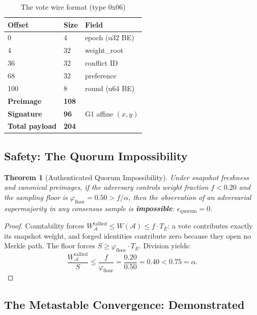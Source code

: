 \documentclass[11pt, a4paper]{article}
\theoremstyle{plain}
\newtheorem{theorem}{Theorem}
\theoremstyle{definition}
\theoremstyle{remark}
\begin{document}
\begin{table}[h]
\centering
{}
\begin{tabular}{lll}
\rowcolor{hsmaTeal!20} \textbf{Offset} & \textbf{Size} & \textbf{Field} \\
\midrule
0 & 4 & epoch (u32 BE) \\
4 & 32 & weight\_root \\
36 & 32 & conflict ID \\
68 & 32 & preference \\
100 & 8 & round (u64 BE) \\
\midrule
\textbf{Preimage} & \textbf{108} & \\
\textbf{Signature} & \textbf{96} & G1 affine $(x, y)$ \\
\textbf{Total payload} & \textbf{204} & \\
\bottomrule
\end{tabular}
\caption{The vote wire format (type 0x06)}
\end{table}

\subsection{Safety: The Quorum Impossibility}

\begin{theorem}[Authenticated Quorum Impossibility]
\label{thm:quorum}
Under snapshot freshness and canonical preimages, if the adversary
controls weight fraction $f < 0.20$ and the sampling floor is
 $\varphi_{\text{floor}} = 0.50 > f/\alpha$, then the observation of
an adversarial supermajority in any consensus sample is
\textbf{impossible}: $\epsilon_{\text{quorum}} = 0$.
\end{theorem}
\begin{proof}
Countability forces $W_{\mathcal{A}}^{\text{tallied}} \le W(\mathcal{A})
\le f \cdot T_E$: a vote contributes exactly its snapshot weight, and
forged identities contribute zero because they open no Merkle path.
The floor forces $S \ge \varphi_{\text{floor}} \cdot T_E$. Division
yields:
\[
\frac{W_{\mathcal{A}}^{\text{tallied}}}{S}
\le \frac{f}{\varphi_{\text{floor}}}
= \frac{0.20}{0.50} = 0.40 < 0.75 = \alpha.
\]
\end{proof}

\subsection{The Metastable Convergence: Demonstrated}
\end{document}
